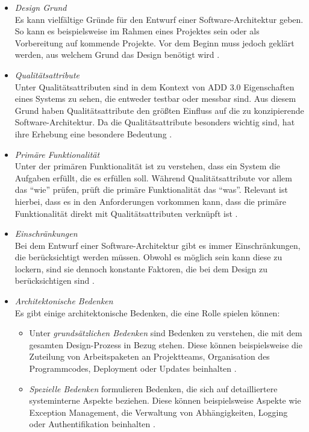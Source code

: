 \begin{itemize}
\item \emph{Design Grund} \\
Es kann vielf\"altige Gr\"unde f\"ur den Entwurf einer Software-Architektur geben. So kann es beispielsweise im Rahmen eines Projektes sein oder als Vorbereitung auf kommende Projekte. Vor dem Beginn muss jedoch gekl\"art werden, aus welchem Grund das Design ben\"otigt wird \cite{Cer01}.
\item \emph{Qualit\"atsattribute} \\
Unter Qualit\"atsattributen sind in dem Kontext von ADD 3.0 Eigenschaften eines Systems zu sehen, die entweder testbar oder messbar sind. Aus diesem Grund haben Qualit\"atsattribute den gr\"o\ss{}ten Einfluss auf die zu konzipierende Software-Architektur. Da die Qualit\"atsattribute besonders wichtig sind, hat ihre Erhebung eine besondere Bedeutung \cite{Cer01}.
\item \emph{Prim\"are Funktionalit\"at} \\
Unter der prim\"aren Funktionalit\"at ist zu verstehen, dass ein System die Aufgaben erf\"ullt, die es erf\"ullen soll. W\"ahrend Qualit\"atsattribute vor allem das ``wie'' pr\"ufen, pr\"uft die prim\"are Funktionalit\"at das ``was''. Relevant ist hierbei, dass es in den Anforderungen vorkommen kann, dass die prim\"are Funktionalit\"at direkt mit Qualit\"atsattributen verkn\"upft ist \cite{Cer01}. 
\item \emph{Einschr\"ankungen} \\
Bei dem Entwurf einer Software-Architektur gibt es immer Einschr\"ankungen, die ber\"ucksichtigt werden m\"ussen. Obwohl es m\"oglich sein kann diese zu lockern, sind sie dennoch konstante Faktoren, die bei dem Design zu ber\"ucksichtigen sind \cite{Cer01}.
\item \emph{Architektonische Bedenken} \\
Es gibt einige architektonische Bedenken, die eine Rolle spielen k\"onnen:
\begin{itemize}
\item Unter \emph{grunds\"atzlichen Bedenken} sind Bedenken zu verstehen, die mit dem gesamten Design-Prozess in Bezug stehen. Diese k\"onnen beispielsweise die Zuteilung von Arbeitspaketen an Projektteams, Organisation des Programmcodes, Deployment oder Updates beinhalten \cite{Cer01}.
\item \emph{Spezielle Bedenken} formulieren Bedenken, die sich auf detailliertere systeminterne Aspekte beziehen. Diese k\"onnen beispielsweise Aspekte wie Exception Management, die Verwaltung von Abh\"angigkeiten, Logging oder Authentifikation beinhalten \cite{Cer01}.

\end{itemize}
\end{itemize}
